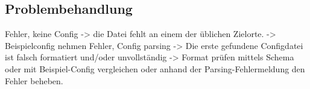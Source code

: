 \subsection{Problembehandlung}
Fehler, keine Config -> die Datei fehlt an einem der üblichen Zielorte.
-> Beispielconfig nehmen
Fehler, Config parsing -> Die erste gefundene Configdatei ist falsch
formatiert und/oder unvollständig -> Format prüfen mittels Schema
oder mit Beispiel-Config vergleichen oder anhand der Parsing-Fehlermeldung
den Fehler beheben.